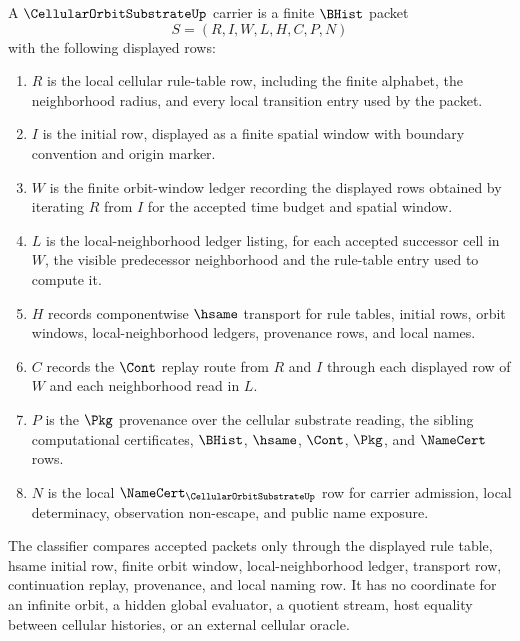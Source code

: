 \begin{definition}
\label{def:cellular-orbit-substrate-carrier}
A $\CellularOrbitSubstrateUp$ carrier is a finite $\BHist$ packet
$$
S=(R,I,W,L,H,C,P,N)
$$
with the following displayed rows:
\begin{enumerate}
\item $R$ is the local cellular rule-table row, including the finite alphabet, the neighborhood radius, and every local transition entry used by the packet.
\item $I$ is the initial row, displayed as a finite spatial window with boundary convention and origin marker.
\item $W$ is the finite orbit-window ledger recording the displayed rows obtained by iterating $R$ from $I$ for the accepted time budget and spatial window.
\item $L$ is the local-neighborhood ledger listing, for each accepted successor cell in $W$, the visible predecessor neighborhood and the rule-table entry used to compute it.
\item $H$ records componentwise $\hsame$ transport for rule tables, initial rows, orbit windows, local-neighborhood ledgers, provenance rows, and local names.
\item $C$ records the $\Cont$ replay route from $R$ and $I$ through each displayed row of $W$ and each neighborhood read in $L$.
\item $P$ is the $\Pkg$ provenance over the cellular substrate reading, the sibling computational certificates, $\BHist$, $\hsame$, $\Cont$, $\Pkg$, and $\NameCert$ rows.
\item $N$ is the local $\NameCert_{\CellularOrbitSubstrateUp}$ row for carrier admission, local determinacy, observation non-escape, and public name exposure.
\end{enumerate}
The classifier compares accepted packets only through the displayed rule table, hsame initial row, finite orbit window, local-neighborhood ledger, transport row, continuation replay, provenance, and local naming row. It has no coordinate for an infinite orbit, a hidden global evaluator, a quotient stream, host equality between cellular histories, or an external cellular oracle.
\end{definition}

